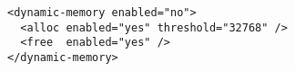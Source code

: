 \begin{verbatim}
<dynamic-memory enabled="no">
  <alloc enabled="yes" threshold="32768" />
  <free  enabled="yes" />
</dynamic-memory>
\end{verbatim}
